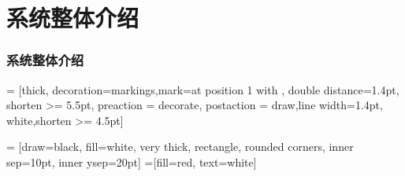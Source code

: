 \documentclass{beamer}
\begin{document}
\section{系统整体介绍}
\begin{frame}
	\frametitle{系统整体介绍}
 = [thick, decoration={markings,mark=at position
   1 with {}},
   double distance=1.4pt, shorten >= 5.5pt,
   preaction = {decorate},
   postaction = {draw,line width=1.4pt, white,shorten >= 4.5pt}]

 = [draw=black, fill=white, very thick,
    rectangle, rounded corners, inner sep=10pt, inner ysep=20pt]
 =[fill=red, text=white]

\def\html{
    \draw[rounded corners=0.1ex,fill=white,thick] (0.2,0.2) rectangle (0.9,1.2);
    \draw[rounded corners=0.1ex,fill=white,thick] (0.1,0.1) rectangle (0.8,1.1);
    \draw[rounded corners=0.1ex,fill=white,thick] (0,0) rectangle (0.7,1);
    \node at (0.35,0.2) {\tiny HTML};
}
\begin{center}
\end{center}
\end{frame}
\end{document}
